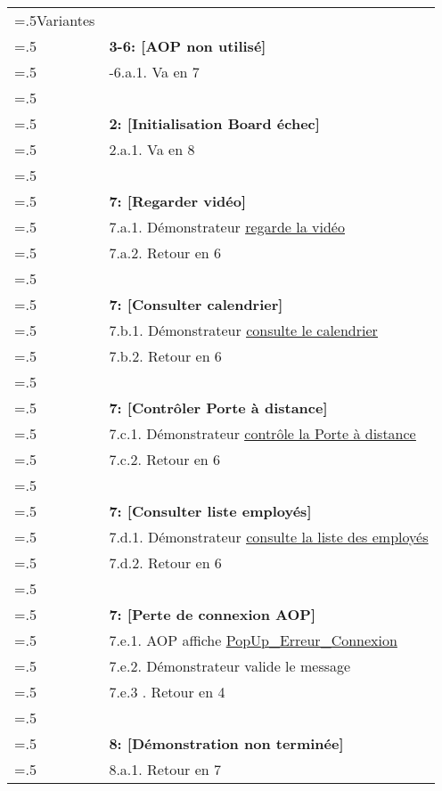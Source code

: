 \newpage
\begin{table}[H]
  \centering
  \begin{tabularx}{\textwidth}{|>{\hsize=.5\hsize}X|>{\hsize=1.5\hsize}X|}
    \hline
    Variantes & \\
    & \textbf{3-6: [AOP non utilisé]} \\
    & 3-6.a.1. Va en 7 \\
    & \\
    & \textbf{2: [Initialisation Board échec]} \hypertarget{initBoardEchec}{}\\ 
    & 2.a.1. Va en 8 \\
    & \\
    & \textbf{7: [Regarder vidéo]} \\
    & 7.a.1. Démonstrateur \hyperlink{CU_Regarder_video}{\underline{regarde la vidéo}} \\
    & 7.a.2. Retour en 6 \\
    & \\
    & \textbf{7: [Consulter calendrier]} \\
    & 7.b.1. Démonstrateur \hyperlink{CU_Consulter_calendrier}{\underline{consulte le calendrier}} \\
    & 7.b.2. Retour en 6 \\
    & \\
    & \textbf{7: [Contrôler Porte à distance]} \\
    & 7.c.1. Démonstrateur \hyperlink{CU_Controler_Porte}{\underline{contrôle la Porte à distance}} \\
    & 7.c.2. Retour en 6 \\
    & \\
    & \textbf{7: [Consulter liste employés]} \\
    & 7.d.1. Démonstrateur \hyperlink{CU_modifier}{\underline{consulte la liste des employés}} \\
    & 7.d.2. Retour en 6 \\
    & \\
    & \textbf{7: [Perte de connexion AOP]} \\
    & 7.e.1. AOP affiche \hyperlink{popUpErreurConnexion}{PopUp\_Erreur\_Connexion} \\
    & 7.e.2. Démonstrateur valide le message \\
    & 7.e.3 . Retour en 4 \\
    & \\
    & \textbf{8: [Démonstration non terminée]} \\
    & 8.a.1. Retour en 7 \\

\end{tabularx}
\end{table}
